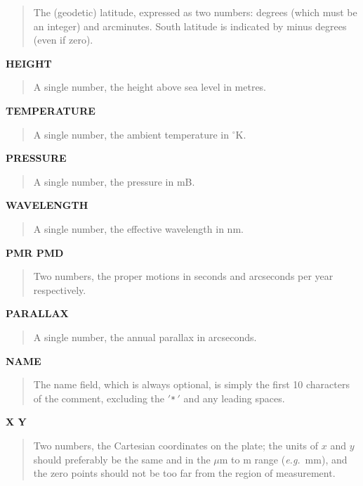 \begin{quote}
 The (geodetic) latitude, expressed as two numbers: degrees (which
 must be an integer) and arcminutes.  South latitude is indicated
 by minus degrees (even if zero).
\end{quote}

\goodbreak
{\bf HEIGHT}

\begin{quote}
 A single number, the height above sea level in metres.
\end{quote}

\goodbreak
{\bf TEMPERATURE}

\begin{quote}
 A single number, the ambient temperature in $^\circ$K.
\end{quote}

\goodbreak
{\bf PRESSURE}

\begin{quote}
 A single number, the pressure in mB.
\end{quote}

\goodbreak
{\bf WAVELENGTH}

\begin{quote}
 A single number, the effective wavelength in nm.
\end{quote}

\goodbreak
{\bf PMR PMD}

\begin{quote}
 Two numbers, the proper motions in seconds and arcseconds
 per year respectively.
\end{quote}

\goodbreak
{\bf PARALLAX}

\begin{quote}
 A single number, the annual parallax in arcseconds.
\end{quote}

\goodbreak
{\bf NAME}

\begin{quote}
 The name field, which is always optional,
 is simply the first 10 characters of
 the comment, excluding the $'$\verb|*|$\,'$ and any leading spaces.
\end{quote}

\goodbreak
{\bf X Y}

\begin{quote}
 Two numbers, the Cartesian coordinates on the plate;
 the units of $x$ and $y$ should preferably be the same and in the
 $\mu$m to m range ({\it e.g.}\ mm), and the zero points
 should not be too far from the region of measurement.
\end{quote}


